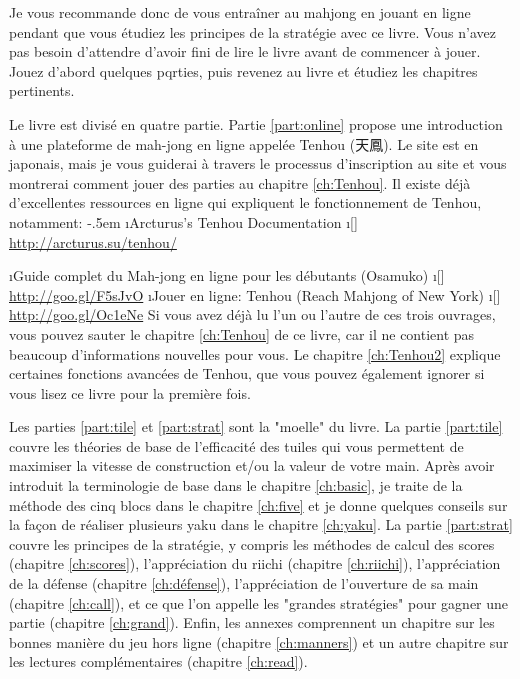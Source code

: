 \bigskip
Je vous recommande donc de vous entraîner au mahjong en jouant en ligne pendant que vous étudiez les principes de la stratégie avec ce livre. Vous n'avez pas besoin d'attendre d'avoir fini de lire le livre avant de commencer à jouer. Jouez d'abord quelques pqrties, puis revenez au livre et étudiez les chapitres pertinents. 

\bigskip

Le livre est divisé en quatre partie. Partie \ref{part:online} propose une introduction à une plateforme de mah-jong en ligne appelée {\jap Tenhou} (天鳳). Le site est en japonais, mais je vous guiderai à travers le processus d'inscription au site et vous montrerai comment jouer des parties au chapitre \ref{ch:Tenhou}. Il existe déjà d'excellentes ressources en ligne qui expliquent le fonctionnement de {\jap Tenhou}, notamment:
\bi \itemsep-.5em
\i Arcturus's Tenhou Documentation
\vspace{-10pt} 
	\bi
	\i[] \url{http://arcturus.su/tenhou/}
	\ei
	
\i Guide complet du Mah-jong en ligne pour les débutants (Osamuko)
\vspace{-10pt} 
	\bi
	\i[] \url{http://goo.gl/F5sJvO}
	\ei
\i Jouer en ligne: Tenhou (Reach Mahjong of New York)
	\bi \i[] \url{http://goo.gl/Oc1eNe} \ei
\ei
Si vous avez déjà lu l'un ou l'autre de ces trois ouvrages, vous pouvez sauter le chapitre \ref{ch:Tenhou} de ce livre, car il ne contient pas beaucoup d'informations nouvelles pour vous. Le chapitre \ref{ch:Tenhou2} explique certaines fonctions avancées de {\jap Tenhou}, que vous pouvez également ignorer si vous lisez ce livre pour la première fois.

\bigskip
Les parties \ref{part:tile} et \ref{part:strat} sont la "moelle" du livre. 
La partie \ref{part:tile} couvre les théories de base de l'efficacité des tuiles qui vous permettent de maximiser la vitesse de construction et/ou la valeur de votre main. Après avoir introduit la terminologie de base dans le chapitre \ref{ch:basic}, je traite de la méthode des cinq blocs dans le chapitre \ref{ch:five} et je donne quelques conseils sur la façon de réaliser plusieurs {\jap yaku} dans le chapitre \ref{ch:yaku}. 
La partie \ref{part:strat} couvre les principes de la stratégie, y compris les méthodes de calcul des scores (chapitre \ref{ch:scores}), l'appréciation du riichi (chapitre \ref{ch:riichi}), l'appréciation de la défense (chapitre \ref{ch:défense}), l'appréciation de l'ouverture de sa main (chapitre \ref{ch:call}), et ce que l'on appelle les "grandes stratégies" pour gagner une partie (chapitre \ref{ch:grand}). 
Enfin, les annexes comprennent un chapitre sur les bonnes manière du jeu hors ligne (chapitre \ref{ch:manners}) et un autre chapitre sur les lectures complémentaires (chapitre \ref{ch:read}). 


